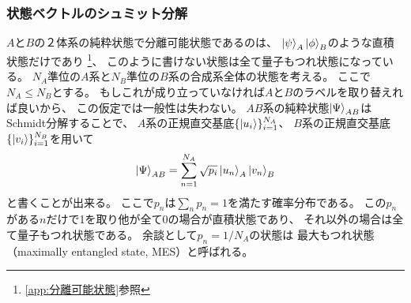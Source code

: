 \documentclass[a4paper, 10pt]{jsarticle}
\begin{document}
\subsubsection{状態ベクトルのシュミット分解}
$A$と$B$の２体系の純粋状態で分離可能状態であるのは、
$\Ket{\psi}_A \Ket{\phi}_B$のような直積状態だけであり
\footnote{\ref{app:分離可能状態}参照}、
このように書けない状態は全て量子もつれ状態になっている。
$N_A$準位の$A$系と$N_B$準位の$B$系の合成系全体の状態を考える。
ここで$N_A \leq N_B$とする。
もしこれが成り立っていなければ$A$と$B$のラベルを取り替えれば良いから、
この仮定では一般性は失わない。
$AB$系の純粋状態$\Ket{\Psi}_{AB}$は
Schmidt分解することで、
$A$系の正規直交基底$\{ \Ket{u_i} \}_{i=1}^{N_A}$、
$B$系の正規直交基底$\{ \Ket{v_i} \}_{i=1}^{N_B}$を用いて
\begin{align}
	\Ket{\Psi}_{AB}
	= \sum_{n=1}^{N_A} \sqrt{p_i} \Ket{u_n}_A \Ket{v_n}_B
\end{align}
と書くことが出来る。
ここで$p_n$は$\sum_n p_n = 1$を満たす確率分布である。
この$p_n$がある$n$だけで1を取り他が全て0の場合が直積状態であり、
それ以外の場合は全て量子もつれ状態である。
余談として$p_n = 1/N_A$の状態は
最大もつれ状態（maximally entangled state, MES）と呼ばれる。
\end{document}
